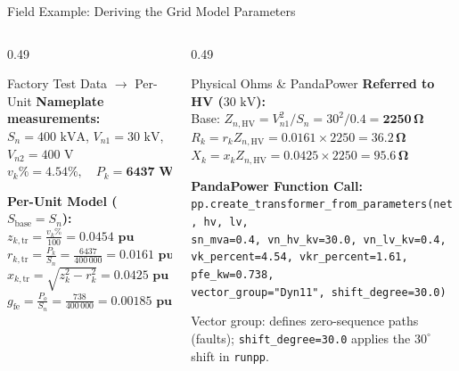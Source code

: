 \begin{frame}{Field Example: Deriving the Grid Model Parameters}
\begin{columns}[T, onlytextwidth]
\begin{column}{0.49\textwidth}
    \begin{block}{\small Factory Test Data $\to$ Per-Unit}
    \scriptsize
    \textbf{Nameplate measurements:}\\
    $S_n = 400\text{ kVA}$, $V_{n1} = 30\text{ kV}$, $V_{n2} = 400\text{ V}$\\
    $v_k\% = \mathbf{4.54\%}, \quad P_k = \mathbf{6437\text{ W}}, \quad P_o = \mathbf{738\text{ W}}$
    
    \vspace{0.1cm}
    \textbf{Per-Unit Model ($S_{\text{base}} = S_n$):}\\
    $z_{k, \text{tr}} = \frac{v_k\%}{100} = \mathbf{0.0454\text{ pu}}$\\[2pt]
    $r_{k, \text{tr}} = \frac{P_k}{S_n} = \frac{6437}{400\,000} = \mathbf{0.0161\text{ pu}} \ (v_{kr}\% = 1.61\%)$\\[2pt]
    $x_{k, \text{tr}} = \sqrt{z_k^2 - r_k^2} = \mathbf{0.0425\text{ pu}} \ (4.25\%)$\\[2pt]
    $g_{\text{fe}} = \frac{P_o}{S_n} = \frac{738}{400\,000} = \mathbf{0.00185\text{ pu}} \ (0.18\%)$
    \end{block}
\end{column}

\begin{column}{0.49\textwidth}
    \begin{block}{\small Physical Ohms \& PandaPower}
    \scriptsize
    \textbf{Referred to HV ($30\text{ kV}$):}\\
    Base: $Z_{n, \text{HV}} = V_{n1}^2 / S_n = 30^2 / 0.4 = \mathbf{2250\,\Omega}$\\[1pt]
    $R_k = r_k Z_{n, \text{HV}} = 0.0161 \times 2250 = \mathbf{36.2\,\Omega}$\\[1pt]
    $X_k = x_k Z_{n, \text{HV}} = 0.0425 \times 2250 = \mathbf{95.6\,\Omega}$

    \vspace{0.04cm}
    \textbf{PandaPower Function Call:}
    \vspace{0.02cm}
    {\fontsize{5.7pt}{6.7pt}\selectfont
\texttt{pp.create\_transformer\_from\_parameters(net, hv, lv,}\\
\quad\texttt{sn\_mva=0.4, vn\_hv\_kv=30.0, vn\_lv\_kv=0.4,}\\
\quad\texttt{vk\_percent=4.54, vkr\_percent=1.61, pfe\_kw=0.738,}\\
\quad\texttt{vector\_group="Dyn11", shift\_degree=30.0)}\\
    }
    \end{block}
    \vspace{0.08cm}
    {\scriptsize\alert{Vector group:} defines zero-sequence paths (faults); \texttt{shift\_degree=30.0} applies the $30^\circ$ shift in \texttt{runpp}.}
\end{column}
\end{columns}
\end{frame}



